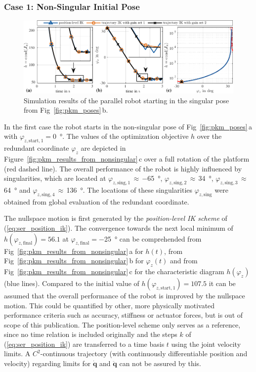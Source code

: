 \documentclass[a4paper,twoside]{article}
\begin{document}
\subsubsection{Case 1: Non-Singular Initial Pose}
\label{sec:eval_case1}

\begin{figure}[tb]
	\includegraphics{figures/pkm_nullspace_case2_overview.pdf}
	\caption{Simulation results of the parallel robot starting in the singular pose from Fig~\ref{fig:pkm_poses}\,b.}
	\label{fig:pkm_results_from_singular}
\end{figure}

In the first case the robot starts in the non-singular pose of Fig~\ref{fig:pkm_poses}\,a with $\varphi_{z,\mathrm{start},1}{=}$\SI{0}{\degree}.
The values of the optimization objective $h$ over the redundant coordinate $\varphi_z$ are depicted in Figure~\ref{fig:pkm_results_from_nonsingular}\,c over a full rotation of the platform (red dashed line).
The overall performance of the robot is highly influenced by singularities, which are located at $\varphi_{z,\mathrm{sing,1}}\,{\approx}\,$\SI{-65}{\degree}, $\varphi_{z,\mathrm{sing,2}}\,{\approx}\,$\SI{34}{\degree}, $\varphi_{z,\mathrm{sing,3}}\,{\approx}\,$\SI{64}{\degree} and $\varphi_{z,\mathrm{sing,4}}\,{\approx}\,$\SI{136}{\degree}.
The locations of these singularities $\varphi_{z,\mathrm{sing}}$ were obtained from global evaluation of the redundant coordinate.

The nullspace motion is first generated by the \emph{position-level IK scheme} of (\ref{eq:ser_position_ik}).
The convergence towards the next local minimum of $h(\varphi_{z,\mathrm{final}}){=}56.1$ at $\varphi_{z,\mathrm{final}}{=}$\SI{-25}{\degree} can be comprehended from Fig~\ref{fig:pkm_results_from_nonsingular}\,a for $h(t)$, from Fig~\ref{fig:pkm_results_from_nonsingular}\,b for $\varphi_z(t)$ and from Fig~\ref{fig:pkm_results_from_nonsingular}\,c for the characteristic diagram $h(\varphi_z)$ (blue lines).
Compared to the initial value of $h(\varphi_{z,\mathrm{start},1}){=}107.5$ it can be assumed that the overall performance of the robot is improved by the nullspace motion.
This could be quantified by other, more physically motivated performance criteria such as accuracy, stiffness or actuator forces, but is out of scope of this publication.
The position-level scheme only serves as a reference, since no time relation is included originally and the steps $k$ of (\ref{eq:ser_position_ik}) are transferred to a time basis $t$ using the joint velocity limits.
A $C^2$-continuous trajectory (with continuously differentiable position and velocity) regarding limits for $\dot{\bm{q}}$ and $\ddot{\bm{q}}$ can not be assured by this.
\end{document}
